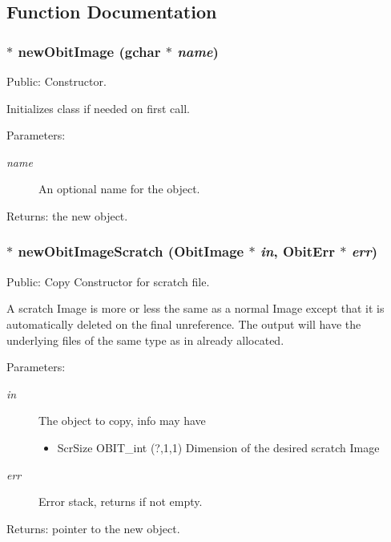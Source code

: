 \subsection{Function Documentation}
\subsubsection{$\ast$ new\-Obit\-Image (gchar $\ast$ {\em name})}\label{ObitImage_8h_a17}


Public: Constructor. 

Initializes class if needed on first call. \begin{Desc}
\item[Parameters:]
\begin{description}
\item[{\em name}]An optional name for the object. \end{description}
\end{Desc}
\begin{Desc}
\item[Returns:]the new object. \end{Desc}
\subsubsection{$\ast$ new\-Obit\-Image\-Scratch ({\bf Obit\-Image} $\ast$ {\em in}, {\bf Obit\-Err} $\ast$ {\em err})}\label{ObitImage_8h_a19}


Public: Copy Constructor for scratch file. 

A scratch Image is more or less the same as a normal Image except that it is automatically deleted on the final unreference. The output will have the underlying files of the same type as in already allocated. \begin{Desc}
\item[Parameters:]
\begin{description}
\item[{\em in}]The object to copy, info may have \begin{itemize}
\item Scr\-Size OBIT\_\-int (?,1,1) Dimension of the desired scratch Image \end{itemize}
\item[{\em err}]Error stack, returns if not empty. \end{description}
\end{Desc}
\begin{Desc}
\item[Returns:]pointer to the new object. \end{Desc}

